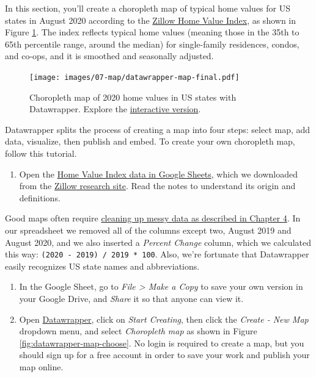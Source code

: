\documentclass[
  english,
]{book}
\providecommand{\tightlist}{%
  \setlength{\itemsep}{0pt}\setlength{\parskip}{0pt}}
\begin{document}
In this section, you'll create a choropleth map of typical home values for US states in August 2020 according to the \href{https://www.zillow.com/research/data/}{Zillow Home Value Index}, as shown in Figure \ref{fig:datawrapper-map-final}. The index reflects typical home values (meaning those in the 35th to 65th percentile range, around the median) for single-family residences, condos, and co-ops, and it is smoothed and seasonally adjusted.



\begin{figure}
\centering
\texttt{[image: images/07-map/datawrapper-map-final.pdf]}
\caption{\label{fig:datawrapper-map-final}Choropleth map of 2020 home values in US states with Datawrapper. Explore the \href{https://datawrapper.dwcdn.net/kSYrw/}{interactive version}.}
\end{figure}

Datawrapper splits the process of creating a map into four steps: select map, add data, visualize, then publish and embed. To create your own choropleth map, follow this tutorial.

\begin{enumerate}
\def\labelenumi{\arabic{enumi}.}
\tightlist
\item
  Open the \href{https://docs.google.com/spreadsheets/d/1Rdaf_buH629NmO1BL_x7PMrD0wpuAeAaw0PMIkYqu1U/edit\#gid=283507276}{Home Value Index data in Google Sheets}, which we downloaded from the \href{https://www.zillow.com/research/data/}{Zillow research site}. Read the notes to understand its origin and definitions.
\end{enumerate}

Good maps often require \href{clean.html}{cleaning up messy data as described in Chapter 4}. In our spreadsheet we removed all of the columns except two, August 2019 and August 2020, and we also inserted a \emph{Percent Change} column, which we calculated this way: \texttt{(2020\ -\ 2019)\ /\ 2019\ *\ 100}. Also, we're fortunate that Datawrapper easily recognizes US state names and abbreviations.

\begin{enumerate}
\def\labelenumi{\arabic{enumi}.}
\setcounter{enumi}{1}
\item
  In the Google Sheet, go to \emph{File \textgreater{} Make a Copy} to save your own version in your Google Drive, and \emph{Share} it so that anyone can view it.
\item
  Open \href{https://www.datawrapper.de}{Datawrapper}, click on \emph{Start Creating}, then click the \emph{Create - New Map} dropdown menu, and select \emph{Choropleth map} as shown in Figure \ref{fig:datawrapper-map-choose}. No login is required to create a map, but you should sign up for a free account in order to save your work and publish your map online.
\end{enumerate}
\end{document}
